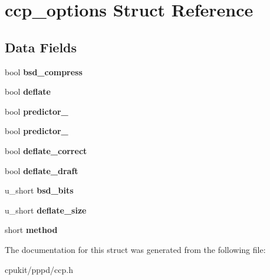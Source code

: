 \hypertarget{structccp__options}{}\section{ccp\+\_\+options Struct Reference}
\label{structccp__options}
\subsection*{Data Fields}
\begin{DoxyCompactItemize}
\item 
\mbox{\label{structccp__options_a483184e16b407427d132f468dd029c73}} 
bool {\bfseries bsd\+\_\+compress}
\item 
\mbox{\label{structccp__options_ab9e84078bfdd2059454294eeafb72a66}} 
bool {\bfseries deflate}
\item 
\mbox{\label{structccp__options_a274c632aee7c5170ad6d0667ba0281fa}} 
bool {\bfseries predictor\+\_}
\item 
\mbox{\label{structccp__options_a36fb4c50d683bd5bde5bf3ee30923d84}} 
bool {\bfseries predictor\+\_}
\item 
\mbox{\label{structccp__options_aaa2358c71f1f60d99a4303932a8a6b39}} 
bool {\bfseries deflate\+\_\+correct}
\item 
\mbox{\label{structccp__options_a6a8d3573e12b77cfccae57b08e4154a1}} 
bool {\bfseries deflate\+\_\+draft}
\item 
\mbox{\label{structccp__options_af6c7883a41bebce65fdd0dd32a490ec3}} 
u\+\_\+short {\bfseries bsd\+\_\+bits}
\item 
\mbox{\label{structccp__options_adbbbf832a4085de1d32ce89ff7745035}} 
u\+\_\+short {\bfseries deflate\+\_\+size}
\item 
\mbox{\label{structccp__options_a7d27d0718997d91b3cfdf0a42046ca5d}} 
short {\bfseries method}
\end{DoxyCompactItemize}


The documentation for this struct was generated from the following file\+:\begin{DoxyCompactItemize}
\item 
cpukit/pppd/ccp.\+h\end{DoxyCompactItemize}
